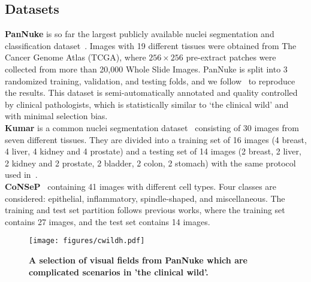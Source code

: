 \documentclass[lettersize,journal]{IEEEtran}
\begin{document}
\subsection{Datasets}
\noindent\textbf{PanNuke} is so far the largest publicly available nuclei segmentation and classification dataset~\cite{gamper2019pannuke,gamper2020pannuke}.
Images with 19 different tissues were obtained from The Cancer Genome Atlas (TCGA), where $256\times 256$ pre-extract patches were collected from more than 20,000 Whole Slide Images. 
PanNuke is split into 3 randomized training, validation, and testing folds, and we follow~\cite{gamper2020pannuke} to reproduce the results. This dataset is semi-automatically annotated and quality controlled by clinical pathologists, which is statistically similar to ‘the clinical wild’ and with minimal selection bias.\\
\textbf{Kumar} is a common nuclei segmentation dataset~\cite{kumar} consisting of 30 images from seven different tissues. They are divided into a training set of 16 images (4 breast, 4 liver, 4 kidney and 4 prostate) and a testing set of 14 images (2 breast, 2 liver, 2 kidney and 2 prostate, 2 bladder, 2 colon, 2 stomach) with the same protocol used in~\cite{hovernet,kumar,dist}.\\
\textbf{CoNSeP}~\cite{hovernet} containing 41 images with different cell types. Four classes are considered: epithelial, inflammatory, spindle-shaped, and miscellaneous. The training and test set partition follows  previous works, where the training set contains 27 images, and the test set contains 14 images.


\begin{figure}[t] 
\centering
\texttt{[image: figures/cwildh.pdf]}
\caption{\textbf{A selection of visual fields from PanNuke which are complicated scenarios in 'the clinical wild'.}}
\label{fig:cwild}
\end{figure}
\end{document}
